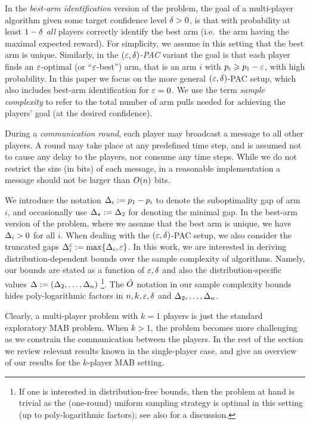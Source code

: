 \documentclass[12pt]{article}
\begin{document}
In the \emph{best-arm identification} version of the problem, the goal of a multi-player algorithm given some target confidence level $\delta>0$, is that with probability at least $1-\delta$ \emph{all} players correctly identify the best arm (i.e.~the arm having the maximal expected reward).
For simplicity, we assume in this setting that the best arm is unique.
Similarly, in the \emph{$(\varepsilon,\delta)$-PAC} variant the goal is that each player finds an $\varepsilon$-optimal (or ``$\varepsilon$-best'') arm, that is an arm $i$ with $p_i \geqslant p_1 - \varepsilon$, with high probability.
In this paper we focus on the more general $(\varepsilon,\delta)$-PAC setup, which also includes best-arm identification for $\varepsilon=0$. 
We use the term \emph{sample complexity} to refer to the total number of arm pulls needed for achieving the players' goal (at the desired confidence).

During a \emph{communication round}, each player may broadcast a message to all other players.
A round may take place at any predefined time step, and is assumed not to cause
any delay to the players, nor consume any time steps.
While we do not restrict the size (in bits) of each message, in a reasonable implementation a message should not be larger than $O(n)$ bits.

We introduce the notation $\Delta_i := p_1 - p_i$ to denote the suboptimality gap of arm $i$, and occasionally use $\Delta_{\star} := \Delta_2$ for denoting the minimal gap. In the best-arm version of the problem, where we assume that the best arm is unique, we have $\Delta_i > 0$ for all $i$.
When dealing with the $(\varepsilon,\delta)$-PAC setup, we also consider the truncated gaps $\Delta^{\varepsilon}_i := \max\{\Delta_i,\varepsilon\}$.
In this work, we are interested in deriving distribution-dependent bounds over the sample complexity of algorithms. Namely, our bounds are stated as a function of $\varepsilon,\delta$ and also the distribution-specific values  $\Delta := (\Delta_2,\ldots,\Delta_n)$%
\footnote{If one is interested in distribution-free bounds, then the problem at hand is trivial as the (one-round) uniform sampling strategy is optimal in this setting (up to poly-logarithmic factors); see also \cite{mannor04} for a discussion.}. 
The $\tilde{O}$ notation in our sample complexity bounds hides poly-logarithmic factors in $n,k,\varepsilon,\delta$ and $\Delta_2,\ldots,\Delta_n$.

Clearly, a multi-player problem with $k=1$ players is just the standard exploratory MAB problem.
When $k > 1$, the problem becomes more challenging as we constrain the communication between the players.
In the rest of the section we review relevant results known in the single-player case, and give an overview of our results for the $k$-player MAB setting.
\end{document}

